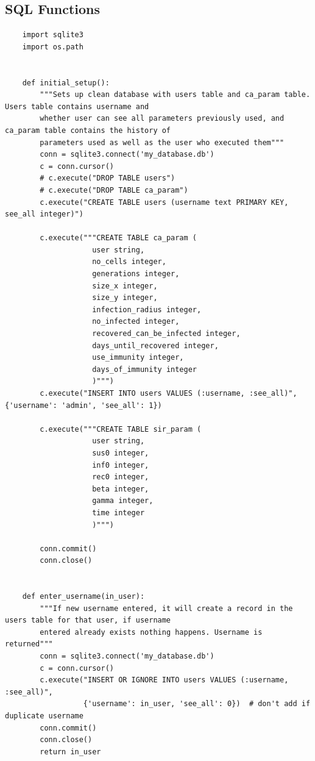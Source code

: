 \documentclass[11pt, a4paper]{article}
\begin{document}
\subsection{SQL Functions}
\begin{lstlisting}
    import sqlite3
    import os.path
    
    
    def initial_setup():
        """Sets up clean database with users table and ca_param table. Users table contains username and
        whether user can see all parameters previously used, and ca_param table contains the history of
        parameters used as well as the user who executed them"""
        conn = sqlite3.connect('my_database.db')
        c = conn.cursor()
        # c.execute("DROP TABLE users")
        # c.execute("DROP TABLE ca_param")
        c.execute("CREATE TABLE users (username text PRIMARY KEY, see_all integer)")
    
        c.execute("""CREATE TABLE ca_param (
                    user string,
                    no_cells integer,
                    generations integer,
                    size_x integer,
                    size_y integer,
                    infection_radius integer,
                    no_infected integer,
                    recovered_can_be_infected integer,
                    days_until_recovered integer,
                    use_immunity integer,
                    days_of_immunity integer    
                    )""")
        c.execute("INSERT INTO users VALUES (:username, :see_all)", {'username': 'admin', 'see_all': 1})
    
        c.execute("""CREATE TABLE sir_param (
                    user string,
                    sus0 integer,
                    inf0 integer,
                    rec0 integer,
                    beta integer,
                    gamma integer,
                    time integer
                    )""")
    
        conn.commit()
        conn.close()
    
    
    def enter_username(in_user):
        """If new username entered, it will create a record in the users table for that user, if username
        entered already exists nothing happens. Username is returned"""
        conn = sqlite3.connect('my_database.db')
        c = conn.cursor()
        c.execute("INSERT OR IGNORE INTO users VALUES (:username, :see_all)",
                  {'username': in_user, 'see_all': 0})  # don't add if duplicate username
        conn.commit()
        conn.close()
        return in_user
    

\end{lstlisting}
\end{document}
